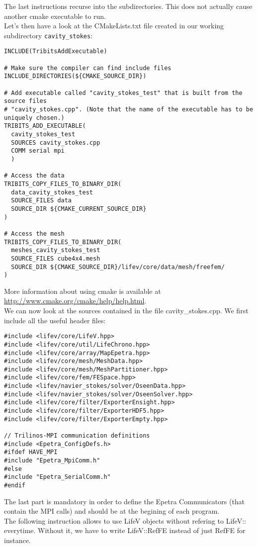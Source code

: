 \noindent The last instructions recurse into the subdirectories. This does not actually cause another cmake executable to run.\\
\indent Let's then have a look at the CMakeLists.txt file created in our working subdirectory \verb!cavity_stokes!:

\begin{verbatim}
INCLUDE(TribitsAddExecutable)

# Make sure the compiler can find include files
INCLUDE_DIRECTORIES(${CMAKE_SOURCE_DIR})

# Add executable called "cavity_stokes_test" that is built from the source files
# "cavity_stokes.cpp". (Note that the name of the executable has to be uniquely chosen.) 
TRIBITS_ADD_EXECUTABLE(
  cavity_stokes_test
  SOURCES cavity_stokes.cpp
  COMM serial mpi
  )

# Access the data
TRIBITS_COPY_FILES_TO_BINARY_DIR(
  data_cavity_stokes_test
  SOURCE_FILES data
  SOURCE_DIR ${CMAKE_CURRENT_SOURCE_DIR}
)

# Access the mesh
TRIBITS_COPY_FILES_TO_BINARY_DIR(
  meshes_cavity_stokes_test
  SOURCE_FILES cube4x4.mesh
  SOURCE_DIR ${CMAKE_SOURCE_DIR}/lifev/core/data/mesh/freefem/
)
\end{verbatim}

\noindent More information about using cmake is available at \url{http://www.cmake.org/cmake/help/help.html}.\\  \indent We can now look at the sources contained in the file cavity\_stokes.cpp. We first include all the useful header files:

\begin{verbatim}
#include <lifev/core/LifeV.hpp>
#include <lifev/core/util/LifeChrono.hpp>
#include <lifev/core/array/MapEpetra.hpp>
#include <lifev/core/mesh/MeshData.hpp>
#include <lifev/core/mesh/MeshPartitioner.hpp>
#include <lifev/core/fem/FESpace.hpp>
#include <lifev/navier_stokes/solver/OseenData.hpp>
#include <lifev/navier_stokes/solver/OseenSolver.hpp>
#include <lifev/core/filter/ExporterEnsight.hpp>
#include <lifev/core/filter/ExporterHDF5.hpp>
#include <lifev/core/filter/ExporterEmpty.hpp>

// Trilinos-MPI communication definitions
#include <Epetra_ConfigDefs.h>
#ifdef HAVE_MPI
#include "Epetra_MpiComm.h"
#else
#include "Epetra_SerialComm.h"
#endif
\end{verbatim}

\noindent The last part is mandatory in order to define the Epetra Communicators (that contain the MPI calls) and should be at the begining of each program.\\
\indent The following instruction allows to use LifeV objects without refering to LifeV:: everytime.
Without it, we have to write LifeV::RefFE instead of just RefFE for instance.

